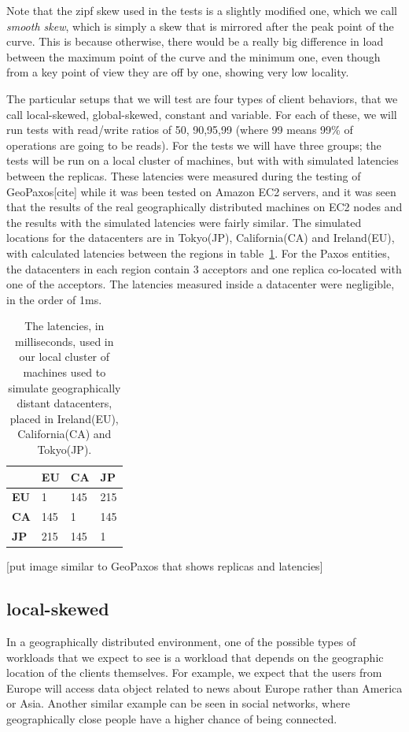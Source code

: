 Note that the zipf skew used in the tests is a slightly modified one, which we call \emph{smooth skew}, which is simply a skew that is mirrored after the peak point of the curve. This is because otherwise, there would be a really big difference in load between the maximum point of the curve and the minimum one, even though from a key point of view they are off by one, showing very low locality.

The particular setups that we will test are four types of client behaviors, that we call local-skewed, global-skewed, constant and variable. For each of these, we will run tests with read/write ratios of 50, 90,95,99 (where 99 means 99\% of operations are going to be reads). For the tests we will have three groups; the tests will be run on a local cluster of machines, but with with simulated latencies between the replicas. These latencies were measured during the testing of GeoPaxos[cite] while it was been tested on Amazon EC2 servers, and it was seen that the results of the real geographically distributed machines on EC2 nodes and the results with the simulated latencies were fairly similar. The simulated locations for the datacenters are in Tokyo(JP), California(CA) and Ireland(EU), with calculated latencies between the regions in table~\ref{tab:latencies}. For the Paxos entities, the datacenters in each region contain 3 acceptors and one replica co-located with one of the acceptors. The latencies measured inside a datacenter were negligible, in the order of 1ms.


\begin{table}[!htb]
  \centering
  \begin{tabular}{l l l l}
    \hline
    & \textbf{EU} & \textbf{CA} & \textbf{JP} \\
    \hline
    \textbf{EU} & 1 & 145 & 215 \\
    \textbf{CA} & 145 & 1 & 145 \\
    \textbf{JP} & 215 & 145 & 1 \\
    \hline
  \end{tabular}
  \caption{The latencies, in milliseconds, used in our local cluster of machines used to simulate geographically distant datacenters, placed in Ireland(EU), California(CA) and Tokyo(JP).}\label{tab:latencies}
\end{table}

[put image similar to GeoPaxos that shows replicas and latencies]

\subsection{local-skewed}\label{sec:local-skewed}
In a geographically distributed environment, one of the possible types of workloads that we expect to see is a workload that depends on the geographic location of the clients themselves. For example, we expect that the users from Europe will access data object related to news about Europe rather than America or Asia. Another similar example can be seen in social networks, where geographically close people have a higher chance of being connected.

